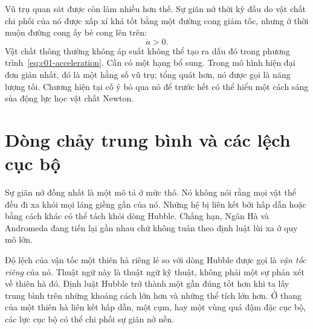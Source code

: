 Vũ trụ quan sát được còn làm nhiều hơn thế. Sự giãn nở thời kỳ đầu do vật chất chi phối của nó được xấp xỉ khá tốt bằng một đường cong giảm tốc, nhưng ở thời muộn đường cong ấy bẻ cong lên trên:
\begin{equation}
\ddot a>0.
\end{equation}
Vật chất thông thường không áp suất không thể tạo ra dấu đó trong phương trình~\eqref{eq:c01-acceleration}. Cần có một hạng bổ sung. Trong mô hình hiện đại đơn giản nhất, đó là một hằng số vũ trụ; tổng quát hơn, nó được gọi là năng lượng tối. Chương hiện tại cố ý bỏ qua nó để trước hết có thể hiểu một cách sáng sủa động lực học vật chất Newton.

\begin{classroomqa}
\end{classroomqa}

\section{Dòng chảy trung bình và các lệch cục bộ}

Sự giãn nở đồng nhất là một mô tả ở mức thô. Nó không nói rằng mọi vật thể đều đi xa khỏi mọi láng giềng gần của nó. Những hệ bị liên kết bởi hấp dẫn hoặc bằng cách khác có thể tách khỏi dòng Hubble. Chẳng hạn, Ngân Hà và Andromeda đang tiến lại gần nhau chứ không tuân theo định luật lùi xa ở quy mô lớn.

Độ lệch của vận tốc một thiên hà riêng lẻ so với dòng Hubble được gọi là \emph{vận tốc riêng} của nó. Thuật ngữ này là thuật ngữ kỹ thuật, không phải một sự phán xét về thiên hà đó. Định luật Hubble trở thành một gần đúng tốt hơn khi ta lấy trung bình trên những khoảng cách lớn hơn và những thể tích lớn hơn. Ở thang của một thiên hà liên kết hấp dẫn, một cụm, hay một vùng quá đậm đặc cục bộ, các lực cục bộ có thể chi phối sự giãn nở nền.

\begin{classroomqa}
\end{classroomqa}

